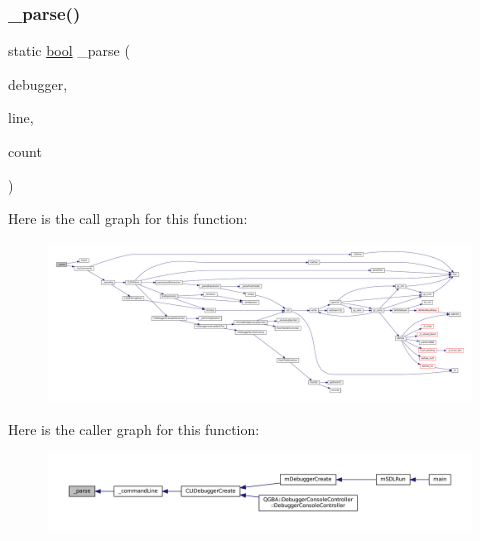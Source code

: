 \subsubsection{\texorpdfstring{\+\_\+parse()}{\_parse()}}
{\footnotesize\ttfamily static \mbox{\hyperlink{libretro_8h_a4a26dcae73fb7e1528214a068aca317e}{bool}} \+\_\+parse (\begin{DoxyParamCaption}\item[{struct C\+L\+I\+Debugger $\ast$}]{debugger,  }\item[{const char $\ast$}]{line,  }\item[{size\+\_\+t}]{count }\end{DoxyParamCaption})\hspace{0.3cm}{\ttfamily [static]}}

Here is the call graph for this function\+:
\nopagebreak
\begin{figure}[H]
\begin{center}
\leavevmode
\includegraphics[width=350pt]{debugger_2cli-debugger_8c_a0d63a2c337b6190b0b5488e84b39beb6_cgraph}
\end{center}
\end{figure}
Here is the caller graph for this function\+:
\nopagebreak
\begin{figure}[H]
\begin{center}
\leavevmode
\includegraphics[width=350pt]{debugger_2cli-debugger_8c_a0d63a2c337b6190b0b5488e84b39beb6_icgraph}
\end{center}
\end{figure}
\mbox{\label{debugger_2cli-debugger_8c_a5fda3702140fba9e4cc65c283462e28b}} 
